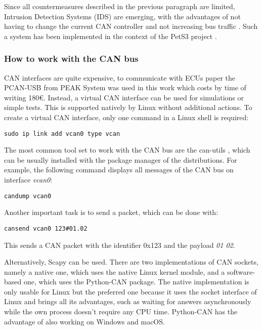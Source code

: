 Since all countermeasures described in the previous paragraph are limited, Intrusion Detection Systems (IDS) are emerging, with the advantages of not having to change the current CAN controller and not increasing bus traffic \cite{Bozdal2020}. Such a system has been implemented in the context of the PetS3 project \cite{spahn2018}.

\subsubsection{How to work with the CAN bus}

CAN interfaces are quite expensive, to communicate with ECUs paper the PCAN-USB from PEAK System was used in this work which costs by time of writing 180€. Instead, a virtual CAN interface can be used for simulations or simple tests. This is supported natively by Linux without additional actions.
To create a virtual CAN interface, only one command in a Linux shell is required:
\begin{samepage}
\begin{verbatim}
sudo ip link add vcan0 type vcan
\end{verbatim}
\end{samepage}

The most common tool set to work with the CAN bus are the can-utils \cite{can-utils}, which can be usually installed with the package manager of the distributions. For example, the following command displays all messages of the CAN bus on interface \emph{vcan0}:
\begin{samepage}
\begin{verbatim}
candump vcan0
\end{verbatim}
\end{samepage}

Another important task is to send a packet, which can be done with:
\begin{samepage}
\begin{verbatim}
cansend vcan0 123#01.02
\end{verbatim}
\end{samepage}

This sends a CAN packet with the identifier 0x123 and the payload \emph{01 02}.

Alternatively, Scapy can be used. There are two implementations of CAN sockets, namely a native one, which uses the native Linux kernel module, and a software-based one, which uses the Python-CAN package.  The native implementation is only usable for Linux but the preferred one because it uses the socket interface of Linux and brings all its advantages, such as waiting for answers asynchronously while the own process doesn't require any CPU time. Python-CAN has the advantage of also working on Windows and macOS.

